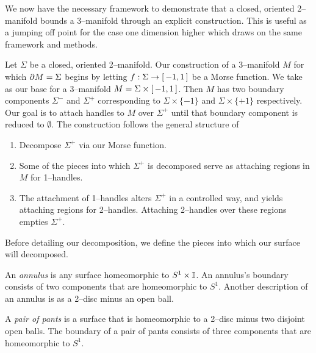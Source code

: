 \label{sec:2bound3}

%		


We now have the necessary framework to demonstrate that a closed, oriented 2--manifold bounds a 3--manifold through an explicit construction.
This is useful as a jumping off point for the case one dimension higher which draws on the same framework and methods.

Let $\Sigma$ be a closed, oriented 2--manifold.
Our construction of a 3--manifold $M$ for which $\partial M=\Sigma$ begins by letting $f:\Sigma\to[\,-1,1\,]$ be a Morse function.
We take as our base for a 3--manifold $M=\Sigma\times[\,-1,1\,]$.
Then $M$ has two boundary components $\Sigma^-$ and $\Sigma^+$ corresponding to $\Sigma\times\{-1\}$ and $\Sigma\times\{+1\}$ respectively.
Our goal is to attach handles to $M$ over $\Sigma^+$ until that boundary component is reduced to $\emptyset$.
The construction follows the general structure of
\begin{enumerate}
	\item Decompose $\Sigma^+$ via our Morse function.
	\item Some of the pieces into which $\Sigma^+$ is decomposed serve as attaching regions in $M$ for 1--handles.
	\item The attachment of 1--handles alters $\Sigma^+$ in a controlled way, and yields attaching regions for 2--handles.  Attaching 2--handles over these regions empties $\Sigma^+$.
\end{enumerate}

Before detailing our decomposition, we define the pieces into which our surface will decomposed.

\begin{defn}
	\label{def:annulus}
	An \emph{annulus} is any surface homeomorphic to $S^1\times\mathbb{I}$.
	An annulus's boundary consists of two components that are homeomorphic to $S^1$.
	Another description of an annulus is as a 2--disc minus an open ball.
\end{defn}

\begin{defn}
	\label{def:pants}
	A \emph{pair of pants} is a surface that is homeomorphic to a 2--disc minus two disjoint open balls.
	The boundary of a pair of pants consists of three components that are homeomorphic to $S^1$.
\end{defn}

